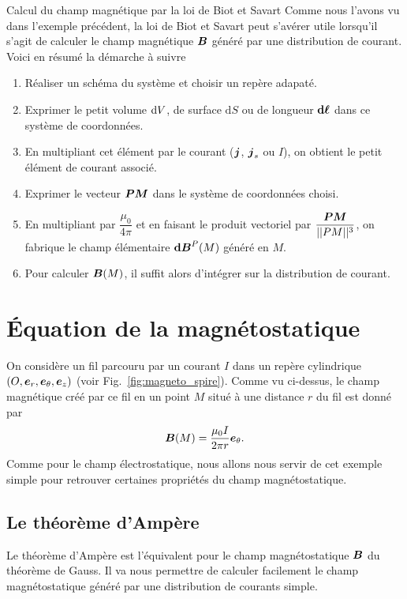 \begin{defn}{Calcul du champ magnétique par la loi de Biot et Savart}
	Comme nous l'avons vu dans l'exemple précédent, la loi de Biot et Savart
	peut s'avérer utile lorsqu'il s'agit de calculer le champ magnétique 
	$\vecb$ généré par une distribution de courant. Voici en résumé la démarche à suivre
	\begin{enumerate}
		\item Réaliser un schéma du système et choisir un repère adapaté.
		\item Exprimer le petit volume $\mathrm{d}V$, de surface $\mathrm{d}S$
		  ou de longueur $\dl$ dans ce système de coordonnées.
	  \item En multipliant cet élément par le courant ($\vecj$, $\vecj_s$ ou
	    $I$), on obtient le petit élément de courant associé.
	  \item Exprimer le vecteur $\mitbf{PM}$ dans le système de coordonnées
	    choisi.
    	\item En multipliant par $\dfrac{\mu_0}{4 \pi}$ et en faisant le produit 
	  vectoriel par $\dfrac{\mitbf{PM}}{||PM||^3}$, on fabrique le champ
	  élémentaire $\mathrm{\textbf{d}}\vecb^P(M)$ généré en $M$.
	\item Pour calculer $\vecb(M)$, il suffit alors d'intégrer sur la distribution
	  de courant.
	\end{enumerate}
\end{defn}
\section{Équation de la magnétostatique}
On considère un fil parcouru par un courant $I$ dans un
repère cylindrique $(O, \er, \etheta, \ez)$ (voir Fig.~\ref{fig:magneto_spire}). 
Comme vu ci-dessus, le champ
magnétique créé par ce fil en un point $M$ situé à une distance $r$ du fil
est donné par
\begin{equation*}
	\vecb(M) = \dfrac{\mu_0 I}{2 \pi r}\etheta.
\end{equation*}
Comme pour le champ électrostatique, nous allons nous servir de cet exemple simple 
pour retrouver certaines propriétés du champ magnétostatique.

\subsection{Le théorème d'Ampère}
Le théorème d'Ampère est l'équivalent pour le champ magnétostatique $\vecb$
du théorème de Gauss. Il va nous permettre de calculer facilement le champ
magnétostatique généré par une distribution de courants simple.

